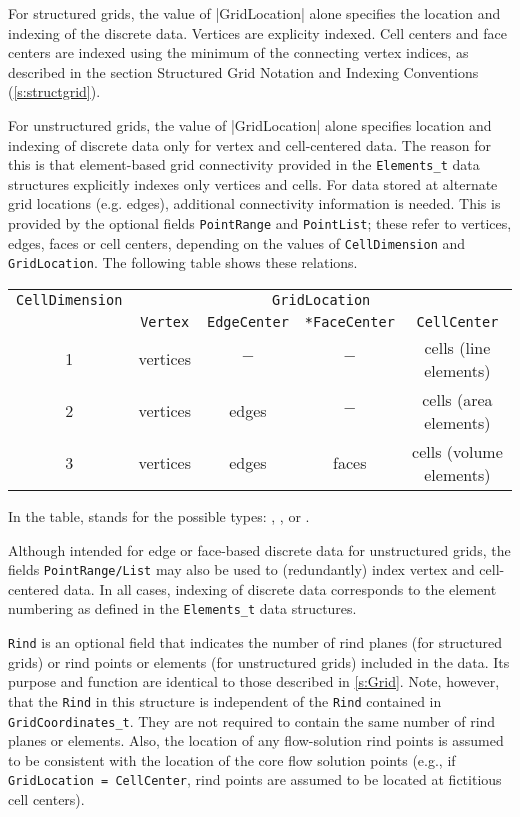 For structured grids, the value of |GridLocation| alone specifies the location
and indexing of the discrete data.  Vertices are explicity indexed.  Cell
centers and face centers are indexed using the minimum of the connecting vertex
indices, as described in the section Structured Grid Notation and Indexing
Conventions (\autoref{s:structgrid}).

For unstructured grids, the value of |GridLocation| alone specifies location and
indexing of discrete data only for vertex and cell-centered data.  The
reason for this is that element-based grid connectivity provided in the
\texttt{Elements\_t} data structures explicitly indexes only vertices and cells.
For data stored at alternate grid locations (e.g. edges), additional
connectivity information is needed.  This is provided by the optional fields
\texttt{PointRange} and \texttt{PointList}; these refer to
vertices, edges, faces or cell centers, depending on the values of
\texttt{CellDimension} and \texttt{GridLocation}.  The following table shows
these relations.

\begin{center}
\begin{tabular}{||c|c|c|c|c||}
 \hline
\texttt{CellDimension} & \multicolumn{4}{c||}{\texttt{GridLocation}} \\
& \texttt{Vertex} & \texttt{EdgeCenter} & \texttt{*FaceCenter} & \texttt{CellCenter} \\
 \hline
1 & vertices & $-$ & $-$ & cells (line elements) \\
2 & vertices & edges & $-$ & cells (area elements) \\
3 & vertices & edges & faces & cells (volume elements) \\
 \hline
\end{tabular}
\end{center}

In the table,  stands for the possible types: ,
,  or .

Although intended for edge or face-based discrete data for unstructured grids,
the fields \texttt{PointRange/List} may also be used to (redundantly) index
vertex and cell-centered data.  In all cases, indexing of discrete data
corresponds to the element numbering as defined in the \texttt{Elements\_t} data
structures.

\texttt{Rind} is an optional field that indicates
the number of rind planes (for structured grids) or rind points or
elements (for unstructured grids) included in the data.
Its purpose and function are identical to those described in
\autoref{s:Grid}.
Note, however, that the \texttt{Rind} in this structure is independent
of the \texttt{Rind} contained in \texttt{GridCoordinates\_t}.
They are not required to contain the same number of rind planes or
elements.
Also, the location of any flow-solution rind points is assumed to be
consistent with the location of the core flow solution points (e.g.,
if \texttt{GridLocation = CellCenter}, rind points are assumed to be
located at fictitious cell centers).

